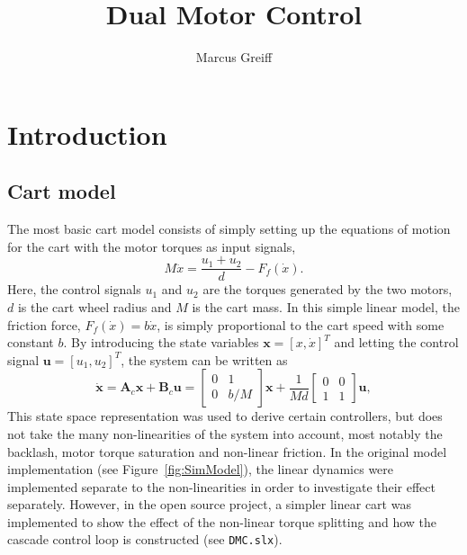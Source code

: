 \documentclass{article}
\title{Dual Motor Control}
\author{Marcus Greiff}
\begin{document}
\maketitle

\section{Introduction}

\subsection{Cart model}
The most basic cart model consists of simply setting up the equations of motion for the cart with the motor torques as input signals,
\begin{equation}\label{eq:motion}
M\ddot{x} = \frac{u_1+u_2}{d} - F_f(\dot{x}).
\end{equation}
Here, the control signals $u_1$ and $u_2$ are the torques generated by the two motors, $d$ is the cart wheel radius and $M$ is the cart mass. In this simple linear model, the friction force, $F_f(\dot{x}) = b\dot{x}$, is simply proportional to the cart speed with some constant $b$. By introducing the state variables $\mathbf{x} = [x, \dot{x}]^T$ and letting the control signal $\mathbf{u} = [u_1, u_2]^T$, the system can be written as
\begin{equation}\label{eq:linModelCart}
\dot{\mathbf{x}} = \mathbf{A}_c\mathbf{x} + \mathbf{B}_c\mathbf{u} =
\begin{bmatrix}
0 & 1\\
0 & b/M
\end{bmatrix}\mathbf{x}  + 
\frac{1}{Md}
\begin{bmatrix}
0 & 0\\
1 & 1
\end{bmatrix}\mathbf{u},
\end{equation}
This state space representation was used to derive certain controllers, but does not take the many non-linearities of the system into account, most notably the backlash, motor torque saturation and non-linear friction. In the original model implementation (see Figure~\ref{fig:SimModel}), the linear dynamics were implemented separate to the non-linearities in order to investigate their effect separately. However, in the open source project, a simpler linear cart was implemented to show the effect of the non-linear torque splitting and how the cascade control loop is constructed (see \texttt{DMC.slx}).
\end{document}
